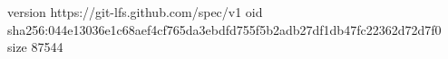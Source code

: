 version https://git-lfs.github.com/spec/v1
oid sha256:044e13036e1c68aef4cf765da3ebdfd755f5b2adb27df1db47fc22362d72d7f0
size 87544
